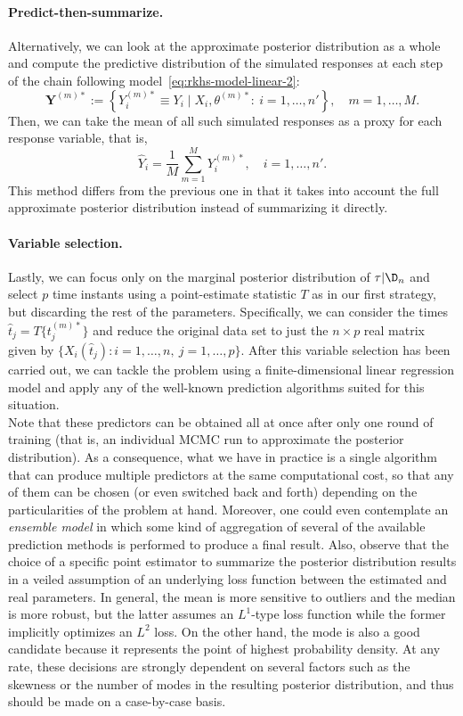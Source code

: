   \paragraph{Predict-then-summarize.} Alternatively, we can  look at the approximate posterior distribution as a whole and compute the predictive distribution of the simulated responses at each step of the chain following model~\eqref{eq:rkhs-model-linear-2}:
  \begin{equation}\label{eq:sampled-response-vector}
  \symbf Y^{(m)*} := \left\{Y_i^{(m)*} \equiv Y_i \mid X_i, \theta^{(m)*}:\ i=1,\dots,n'\right\}, \quad m=1,\dots,M.
  \end{equation}
  Then, we can take the mean of all such simulated responses as a proxy for each response variable, that is,
  \[
  \hat Y_i = \frac{1}{M}\sum_{m=1}^M Y_i^{(m)*}, \quad i=1,\dots,n'.
  \]
  This method differs from the previous one in that it takes into account the full approximate posterior distribution instead of summarizing it directly.

  \paragraph{Variable selection.} Lastly, we can focus only on the marginal posterior distribution of \(\tau|\D_n\) and select \(p\) time instants using a point-estimate statistic \(T\) as in our first strategy, but discarding the rest of the parameters. Specifically, we can consider the times \(\hat t_j = T\{t_j^{(m)*}\}\) and reduce the original data set to just the \(n\times p\) real matrix given by \(\{X_i(\hat t_j): i=1, \dots,n, \ j=1,\dots,p\}\). After this variable selection has been carried out, we can tackle the problem using a finite-dimensional linear regression model and apply any of the well-known prediction algorithms suited for this situation.\\

Note that these predictors can be obtained all at once after only one round of training (that is, an individual MCMC run to approximate the posterior distribution). As a consequence, what we have in practice is a single algorithm that can produce multiple predictors at the same computational cost, so that any of them can be chosen (or even switched back and forth) depending on the particularities of the problem at hand. Moreover, one could even contemplate an \textit{ensemble model} in which some kind of aggregation of several of the available prediction methods is performed to produce a final result. Also, observe that the choice of a specific point estimator to summarize the posterior distribution results in a veiled assumption of an underlying loss function between the estimated and real parameters. In general, the mean is more sensitive to outliers and the median is more robust, but the latter assumes an \(L^1\)-type loss function while the former implicitly optimizes an \(L^2\) loss. On the other hand, the mode is also a good candidate because it represents the point of highest probability density. At any rate, these decisions are strongly dependent on several factors such as the skewness or the number of modes in the resulting posterior distribution, and thus should be made on a case-by-case basis.


